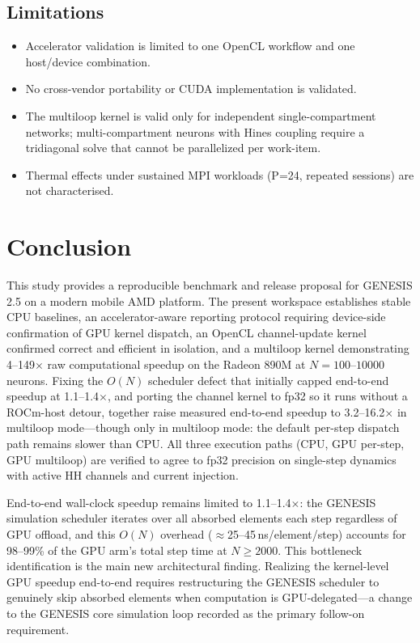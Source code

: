 \documentclass[11pt,a4paper]{article}
\begin{document}
\subsection{Limitations}

\begin{itemize}[nosep]
  \item Accelerator validation is limited to one OpenCL workflow and one host/device combination.
  \item No cross-vendor portability or CUDA implementation is validated.
  \item The multiloop kernel is valid only for independent single-compartment networks; multi-compartment neurons with Hines coupling require a tridiagonal solve that cannot be parallelized per work-item.
  \item Thermal effects under sustained MPI workloads (P=24, repeated sessions) are not characterised.
\end{itemize}

\section{Conclusion}

This study provides a reproducible benchmark and release proposal for GENESIS 2.5 on a modern mobile AMD platform. The present workspace establishes stable CPU baselines, an accelerator-aware reporting protocol requiring device-side confirmation of GPU kernel dispatch, an OpenCL channel-update kernel confirmed correct and efficient in isolation, and a multiloop kernel demonstrating 4--149$\times$ raw computational speedup on the Radeon 890M at $N = 100$--$10000$ neurons. Fixing the $O(N)$ scheduler defect that initially capped end-to-end speedup at 1.1--1.4$\times$, and porting the channel kernel to fp32 so it runs without a ROCm-host detour, together raise measured end-to-end speedup to 3.2--16.2$\times$ in multiloop mode---though only in multiloop mode: the default per-step dispatch path remains slower than CPU. All three execution paths (CPU, GPU per-step, GPU multiloop) are verified to agree to fp32 precision on single-step dynamics with active HH channels and current injection.

End-to-end wall-clock speedup remains limited to 1.1--1.4$\times$: the GENESIS simulation scheduler iterates over all absorbed elements each step regardless of GPU offload, and this $O(N)$ overhead ($\approx$25--45\,ns/element/step) accounts for 98--99\% of the GPU arm's total step time at $N \geq 2000$. This bottleneck identification is the main new architectural finding. Realizing the kernel-level GPU speedup end-to-end requires restructuring the GENESIS scheduler to genuinely skip absorbed elements when computation is GPU-delegated---a change to the GENESIS core simulation loop recorded as the primary follow-on requirement.
\end{document}
